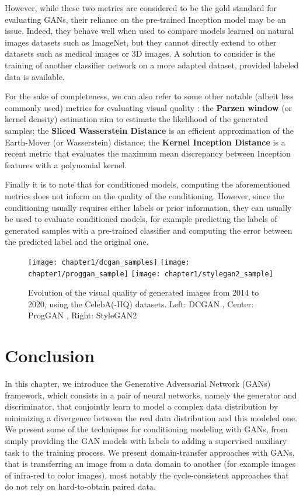 However, while these two metrics are considered to be the gold standard for evaluating \ac{GAN}s, their reliance on the pre-trained Inception model may be an issue. Indeed, they behave well when used to compare models learned on natural images datasets such as ImageNet, but they cannot directly extend to other datasets such as medical images or 3D images. A solution to consider is the training of another classifier network on a more adapted dataset, provided labeled data is available.

For the sake of completeness, we can also refer to some other notable (albeit less commonly used) metrics for evaluating visual quality  \citep{Borji2018}: the \textbf{Parzen window} (or kernel density) estimation \citep{Parzen1962} aim to estimate the likelihood of the generated samples; the \textbf{Sliced Wasserstein Distance} \citep{Julien2011} is an efficient approximation of the Earth-Mover (or Wasserstein) distance; the  \textbf{Kernel Inception Distance} \citep{Binkowski2018} is a recent metric that evaluates the maximum mean discrepancy between Inception features with a polynomial kernel.

Finally it is to note that for conditioned models, computing the aforementioned metrics does not inform on the quality of the conditioning. However, since the conditioning usually requires either labels or prior information, they can usually be used to evaluate conditioned models, for example predicting the labels of generated samples with a pre-trained classifier and computing the error between the predicted label and the original one.

\begin{figure}
	\centering
	\texttt{[image: chapter1/dcgan\_samples]}	\texttt{[image: chapter1/proggan\_sample]}	\texttt{[image: chapter1/stylegan2\_sample]}
	\caption[Evolution of the visual quality of generated images]{Evolution of the visual quality of generated images from 2014 to 2020, using the CelebA(-HQ) \citep{Liu2015} datasets. Left: DCGAN \citep{Radford2015}, Center: ProgGAN \citep{Karras2017}, Right: StyleGAN2 \citep{Karras2020}}
\end{figure}

\section{Conclusion}

In this chapter, we introduce the Generative Adversarial Network (\ac{GANs}) framework, which consists in a pair of neural networks, namely the generator and discriminator, that conjointly learn to model a complex data distribution by minimizing a divergence between the real data distribution and this modeled one. We present some of the techniques for conditioning modeling with GANs, from simply providing the GAN models with labels to adding a supervised auxiliary task to the training process. We present domain-transfer approaches with GANs, that is transferring an image from a data domain to another (for example images of infra-red to color images), most notably the cycle-consistent approaches that do not rely on hard-to-obtain paired data. 

